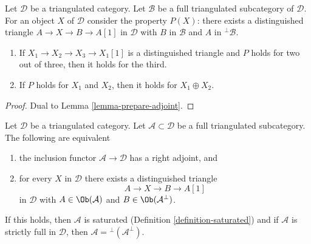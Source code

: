 \begin{lemma}
\label{lemma-prepare-adjoint-dual}
Let $\mathcal{D}$ be a triangulated category. Let $\mathcal{B}$
be a full triangulated subcategory of $\mathcal{D}$. For an object $X$
of $\mathcal{D}$ consider the property $P(X)$: there exists a
distinguished triangle $A \to X \to B \to A[1]$
in $\mathcal{D}$ with $B$ in $\mathcal{B}$ and $A$ in ${}^\perp\mathcal{B}$.
\begin{enumerate}
\item If $X_1 \to X_2 \to X_3 \to X_1[1]$ is a distinguished triangle
and $P$ holds for two out of three, then it holds for the third.
\item If $P$ holds for $X_1$ and $X_2$, then it holds for $X_1 \oplus X_2$.
\end{enumerate}
\end{lemma}

\begin{proof}
Dual to Lemma \ref{lemma-prepare-adjoint}.
\end{proof}

\begin{lemma}
\label{lemma-right-adjoint}
Let $\mathcal{D}$ be a triangulated category. Let
$\mathcal{A} \subset \mathcal{D}$ be a full triangulated subcategory.
The following are equivalent
\begin{enumerate}
\item the inclusion functor $\mathcal{A} \to \mathcal{D}$
has a right adjoint, and
\item for every $X$ in $\mathcal{D}$ there exists a distinguished
triangle
$$
A \to X \to B \to A[1]
$$
in $\mathcal{D}$ with $A \in \Ob(\mathcal{A})$ and
$B \in \Ob(\mathcal{A}^\perp)$.
\end{enumerate}
If this holds, then $\mathcal{A}$ is saturated
(Definition \ref{definition-saturated}) and if $\mathcal{A}$
is strictly full in $\mathcal{D}$, then
$\mathcal{A} = {}^\perp(\mathcal{A}^\perp)$.
\end{lemma}

